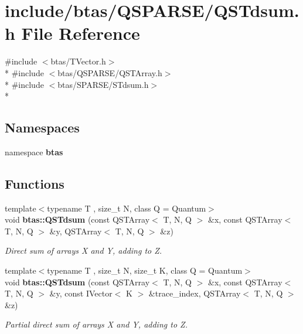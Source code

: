 \section{include/btas/\-Q\-S\-P\-A\-R\-S\-E/\-Q\-S\-Tdsum.h File Reference}
\label{d2/d1f/QSTdsum_8h}
{\ttfamily \#include $<$btas/\-T\-Vector.\-h$>$}\\*
{\ttfamily \#include $<$btas/\-Q\-S\-P\-A\-R\-S\-E/\-Q\-S\-T\-Array.\-h$>$}\\*
{\ttfamily \#include $<$btas/\-S\-P\-A\-R\-S\-E/\-S\-Tdsum.\-h$>$}\\*
\subsection*{Namespaces}
\begin{DoxyCompactItemize}
\item 
namespace {\bf btas}
\end{DoxyCompactItemize}
\subsection*{Functions}
\begin{DoxyCompactItemize}
\item 
{\footnotesize template$<$typename T , size\-\_\-t N, class Q  = Quantum$>$ }\\void {\bf btas\-::\-Q\-S\-Tdsum} (const Q\-S\-T\-Array$<$ T, N, Q $>$ \&x, const Q\-S\-T\-Array$<$ T, N, Q $>$ \&y, Q\-S\-T\-Array$<$ T, N, Q $>$ \&z)
\begin{DoxyCompactList}\small\item\em Direct sum of arrays X and Y, adding to Z. \end{DoxyCompactList}\item 
{\footnotesize template$<$typename T , size\-\_\-t N, size\-\_\-t K, class Q  = Quantum$>$ }\\void {\bf btas\-::\-Q\-S\-Tdsum} (const Q\-S\-T\-Array$<$ T, N, Q $>$ \&x, const Q\-S\-T\-Array$<$ T, N, Q $>$ \&y, const I\-Vector$<$ K $>$ \&trace\-\_\-index, Q\-S\-T\-Array$<$ T, N, Q $>$ \&z)
\begin{DoxyCompactList}\small\item\em Partial direct sum of arrays X and Y, adding to Z. \end{DoxyCompactList}\end{DoxyCompactItemize}
